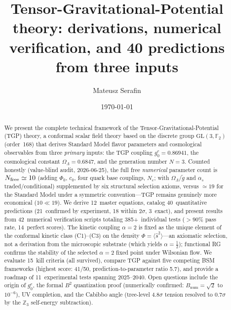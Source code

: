 \documentclass[aps,prd,twocolumn,superscriptaddress,showpacs,
  nofootinbib,floatfix,longbibliography]{revtex4-2}
\newcommand{\gone}{{g_0^e}}
\newcommand{\OL}{\Omega_\Lambda}
\newcommand{\GL}{\mathrm{GL}(3,\mathbb{F}_2)}
\newcommand{\as}{\alpha_s}
\begin{document}
\title{Tensor-Gravitational-Potential theory: derivations,
  numerical verification, and 40 predictions from three inputs}

\author{Mateusz Serafin}

\date{\today}

\begin{abstract}
We present the complete technical framework of the
Tensor-Gravitational-Potential (TGP) theory, a conformal scalar field
theory based on the discrete group $\GL$ (order~168) that derives
Standard Model flavor parameters and cosmological observables from
three \emph{primary} inputs: the TGP coupling $\gone = 0.86941$, the
cosmological constant $\OL = 0.6847$, and the generation number
$N = 3$. Counted honestly (value-blind audit, 2026-06-25), the full
free \emph{numerical} parameter count is $N_{\rm free}\simeq 10$
(adding $\Phi_0$, $c_0$, four quark base couplings, $N_e$; with
$\OL/\tilde g$ and $\as$ traded/conditional) supplemented by six
structural selection axioms, versus $\simeq 19$ for the Standard Model
under a symmetric convention---TGP remains genuinely more economical
($10 \ll 19$). We derive 12~master equations, catalog 40~quantitative
predictions (21~confirmed by experiment, 18 within $2\sigma$, 3~exact),
and present results from 42~numerical verification scripts totaling
385+~individual tests ($> 90\%$ pass rate, 14~perfect scores). The
kinetic coupling $\alpha = 2$ is fixed as the unique element of the
conformal kinetic class (C1)--(C3) on the density $\Phi=\langle\hat s^2\rangle$---an
axiomatic selection, not a derivation from the microscopic substrate (which
yields $\alpha=\tfrac12$); functional RG confirms the stability of the selected
$\alpha = 2$ fixed point under Wilsonian flow. We evaluate 15~kill criteria (all survived), compare
TGP against five competing BSM frameworks (highest score: 41/50,
prediction-to-parameter ratio 5.7), and provide a roadmap of
11~experimental tests spanning 2025--2040. Open questions include the
origin of $\gone$, the formal $B^2$ quantization proof (numerically
confirmed: $B_\mathrm{num} = \sqrt{2}$ to $10^{-6}$), UV completion,
and the Cabibbo angle (tree-level $4.8\sigma$ tension resolved
to $0.7\sigma$ by the $\mathbb{Z}_3$ self-energy subtraction).
\end{abstract}

\maketitle
\tableofcontents
\end{document}
